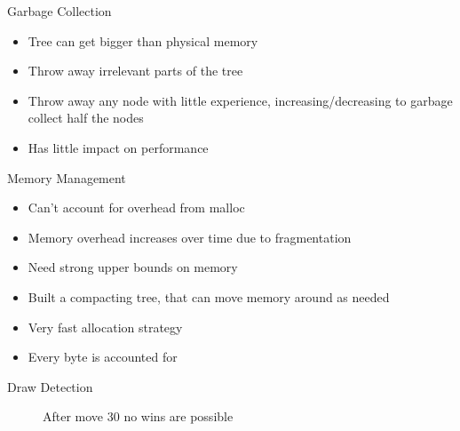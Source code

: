 \documentclass{beamer} %
\begin{document}
\begin{frame}{Garbage Collection}
\begin{itemize}
\item Tree can get bigger than physical memory
\item Throw away irrelevant parts of the tree
\item Throw away any node with little experience, increasing/decreasing to garbage collect half the nodes
\item Has little impact on performance
\end{itemize}
\end{frame}

\begin{frame}{Memory Management}
\begin{itemize}
\item Can't account for overhead from malloc
\item Memory overhead increases over time due to fragmentation
\item Need strong upper bounds on memory
\item Built a compacting tree, that can move memory around as needed
\item Very fast allocation strategy
\item Every byte is accounted for
\end{itemize}
\end{frame}



\begin{frame}{Draw Detection}
\begin{figure}
	\centering
	\begin{HavannahBoard}[board size=4,coordinate style=classical,show coordinates=false]
	\end{HavannahBoard}
	\caption{After move 30 no wins are possible}
\end{figure}
\end{frame}
\end{document}
